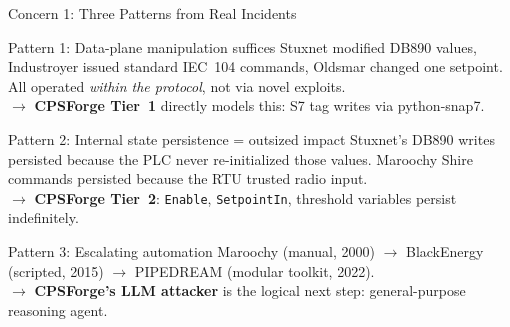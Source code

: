 \documentclass[aspectratio=169,10pt]{beamer}
\begin{document}
\begin{frame}{Concern 1: Three Patterns from Real Incidents}

\begin{block}{Pattern 1: Data-plane manipulation suffices}
Stuxnet modified DB890 values, Industroyer issued standard IEC~104 commands, Oldsmar changed one setpoint. All operated \emph{within the protocol}, not via novel exploits.\\
$\rightarrow$ \textbf{CPSForge Tier~1} directly models this: S7 tag writes via python-snap7.
\end{block}

\begin{block}{Pattern 2: Internal state persistence = outsized impact}
Stuxnet's DB890 writes persisted because the PLC never re-initialized those values. Maroochy Shire commands persisted because the RTU trusted radio input.\\
$\rightarrow$ \textbf{CPSForge Tier~2}: \texttt{Enable}, \texttt{SetpointIn}, threshold variables persist indefinitely.
\end{block}

\begin{block}{Pattern 3: Escalating automation}
Maroochy (manual, 2000) $\rightarrow$ BlackEnergy (scripted, 2015) $\rightarrow$ PIPEDREAM (modular toolkit, 2022).\\
$\rightarrow$ \textbf{CPSForge's LLM attacker} is the logical next step: general-purpose reasoning agent.
\end{block}

\end{frame}
\end{document}
